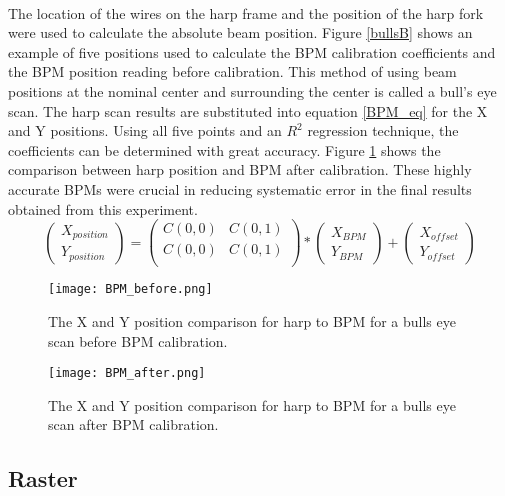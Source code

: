 		\paragraph{}The location of the wires on the harp frame and the position of the harp fork were used to calculate the absolute beam position. Figure \ref{bullsB} shows an example of five positions used to calculate the BPM calibration coefficients and the BPM position reading before calibration. This method of using beam positions at the nominal center and surrounding the center is called a bull's eye scan. The harp scan results are substituted into equation \ref{BPM_eq} for the X and Y positions. Using all five points and an $R^2$ regression technique, the coefficients can be determined with great accuracy. Figure \ref{bulls} shows the comparison between harp position and BPM after calibration. These highly accurate BPMs were crucial in reducing systematic error in the final results obtained from this experiment. 
		\begin{equation}
		\label{BPM_eq}
		\begin{pmatrix}
		X_{position}\\
		Y_{position}
		\end{pmatrix}
		=
		\begin{pmatrix}
		C(0,0) & C(0,1)\\
		C(0,0) & C(0,1)\\
		\end{pmatrix}
		*
		\begin{pmatrix}
		X_{BPM}\\
		Y_{BPM}
		\end{pmatrix}
		+
		\begin{pmatrix}
		X_{offset}\\
		Y_{offset}
		\end{pmatrix}			 
		\end{equation}
		
		\begin{figure}[H]
			\centering
			\texttt{[image: BPM\_before.png]} 
			\caption{The X and Y position comparison for harp to BPM for a bulls eye scan before BPM calibration. }
			\label{bullsB}

			\texttt{[image: BPM\_after.png]} 
			\caption{The X and Y position comparison for harp to BPM for a bulls eye scan after BPM calibration. }
			\label{bulls}
			
		\end{figure} 	

	 \subsection{Raster}
